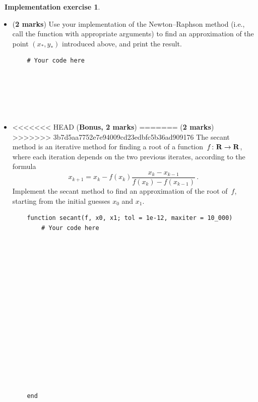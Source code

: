\documentclass[10pt]{article}
\theoremstyle{definition}
\newtheorem{compexercise}{{\normalfont \faLaptop}~Implementation exercise}
\renewcommand{\mymarks}[1]{\textbf{#1 marks}}
\begin{document}
\begin{compexercise}
\begin{itemize}
\begin{verbatim}
    end
            \end{verbatim}

        \item
            (\mymarks{2})
            Use your implementation of the Newton--Raphson method (i.e., call the function with appropriate arguments) to find an approximation of the point $(x_*, y_*)$ introduced above,
            and print the result.
            \begin{verbatim}
    # Your code here






            \end{verbatim}

        \item
<<<<<<< HEAD
            (\textbf{Bonus, 2 marks})
=======
            (\mymarks{2})
>>>>>>> 3b7d5aa7752e7e94009cd23edbfc5b36ad909176
            The secant method is an iterative method for finding a root of a function~$f \colon \mathbf R \to \mathbf R$,
            where each iteration depends on the two previous iterates,
            according to the formula
            \[
                x_{k+1} = x_k - f(x_k) \frac{x_k - x_{k-1}}{f(x_k) - f(x_{k-1})} \, .
            \]
            Implement the secant method to find an approximation of the root of~$f$,
            starting from the initial guesses $x_0$ and $x_1$.
            \begin{verbatim}
    function secant(f, x0, x1; tol = 1e-12, maxiter = 10_000)
        # Your code here
















    end
            \end{verbatim}
    \end{itemize}
\end{compexercise}
\end{document}
